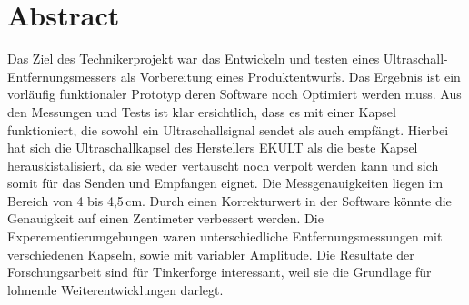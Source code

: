 \section{Abstract}
Das Ziel des Technikerprojekt war das Entwickeln und testen eines Ultraschall-Entfernungsmessers als Vorbereitung eines Produktentwurfs. Das Ergebnis ist ein vorläufig funktionaler Prototyp deren Software noch Optimiert werden muss.
Aus den Messungen und Tests ist klar ersichtlich, dass es mit einer Kapsel funktioniert, die sowohl ein Ultraschallsignal sendet als auch empfängt. Hierbei hat sich die Ultraschallkapsel des Herstellers EKULT als die beste Kapsel herauskistalisiert, da sie weder vertauscht noch verpolt werden kann und sich somit für das Senden und Empfangen eignet.
Die Messgenauigkeiten liegen im Bereich von 4 bis 4,5\,cm. Durch einen Korrekturwert in der Software könnte die Genauigkeit auf einen Zentimeter verbessert werden.
Die Experementierumgebungen waren unterschiedliche Entfernungsmessungen mit verschiedenen Kapseln, sowie mit variabler Amplitude. Die Resultate der Forschungsarbeit sind für Tinkerforge interessant, weil sie die Grundlage für lohnende Weiterentwicklungen darlegt.



